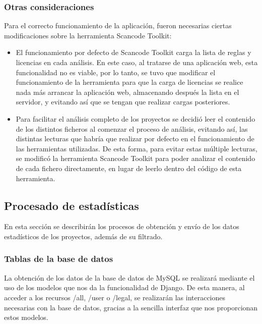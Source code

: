 \documentclass[a4paper, spanish, 12pt]{book}
\begin{document}
\subsubsection*{Otras consideraciones}
\label{subsubsec:consideraciones}

Para el correcto funcionamiento de la aplicaci\'on, fueron necesarias ciertas modificaciones
sobre la herramienta Scancode Toolkit:

\begin{itemize}
\item El funcionamiento por defecto de Scancode Toolkit carga la lista de reglas
y licencias en cada an\'alisis. En este caso, al tratarse de una aplicaci\'on web,
esta funcionalidad no es viable, por lo tanto, se tuvo que modificar el
funcionamiento de la herramienta para que la carga de licencias se realice
nada m\'as arrancar la aplicaci\'on web, almacenando despu\'es la lista en el
servidor, y evitando as\'i que se tengan que realizar cargas posteriores.

\item Para facilitar el an\'alisis completo de los proyectos se decidi\'o leer
el contenido de los distintos ficheros al comenzar el proceso de an\'alisis,
evitando as\'i, las distintas lecturas que habr\'ia que realizar por defecto en el
funcionamiento de las herramientas utilizadas. De esta forma, para evitar estas
m\'ultiple lecturas, se modific\'o la herramienta Scancode Toolkit para poder
analizar el contenido de cada fichero directamente, en lugar de leerlo dentro
del c\'odigo de esta herramienta.

\end{itemize}

\subsection{Procesado de estad\'isticas}
\label{subsec:statistics}

En esta secci\'on se describir\'an los procesos de obtenci\'on y env\'io de los datos
estad\'isticos de los proyectos, adem\'as de su filtrado.

\subsubsection*{Tablas de la base de datos}
\label{subsubsec:tablas_bd}

La obtenci\'on de los datos de la base de datos de MySQL se realizar\'a mediante
el uso de los modelos que nos da la funcionalidad de Django. De esta manera, al
acceder a los recursos /all, /user o /legal, se realizar\'an las interacciones
necesarias con la base de datos, gracias a la sencilla interfaz que nos proporcionan
estos modelos.
\end{document}
